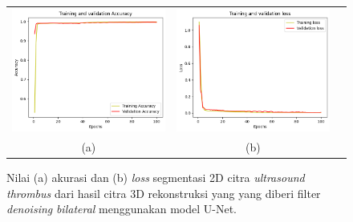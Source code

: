 \begin{enumerate}
	
	\begin{figure}[htbp]
		\centering
		\begin{tabular}{ccc}
			\includegraphics[scale=0.5]{bab4/Rekap Training/UNet/Bilateral/5/acc_99,65311884880066.png} &
			\includegraphics[scale=0.5]{bab4/Rekap Training/UNet/Bilateral/5/loss_0,0096.png} & \\
			(a) & (b)    %
		\end{tabular}
		\caption{Nilai (a) akurasi dan (b) \textit{loss} segmentasi 2D citra \textit{ultrasound} \textit{thrombus} dari hasil citra 3D rekonstruksi yang yang diberi filter \textit{denoising} \textit{bilateral} menggunakan model U-Net.}
		\label{fig:performance-bilateral-unet-rekonstruksi}
	\end{figure}
	

\end{enumerate}
